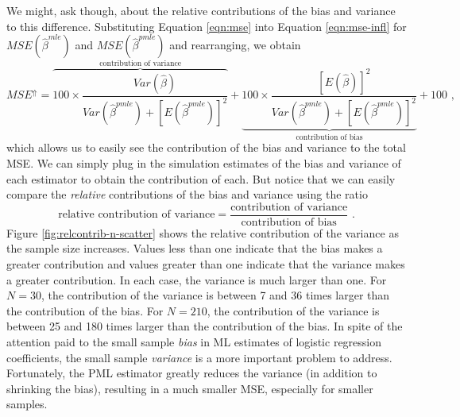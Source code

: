 \documentclass[12pt]{article}
\begin{document}
We might, ask though, about the relative contributions of the bias and variance to this difference. 
Substituting Equation \ref{eqn:mse} into Equation \ref{eqn:mse-infl} for $MSE(\hat{\beta}^{mle})$ and $MSE(\hat{\beta}^{pmle})$ and rearranging, we obtain
\begin{equation}
MSE^\Uparrow = \overbrace{100 \times \dfrac{Var(\hat{\beta})}{Var(\hat{\beta}^{pmle}) + [E(\hat{\beta}^{pmle})]^2}}^{\text{contribution of variance}} + \underbrace{100 \times \dfrac{[E(\hat{\beta})]^2}{Var(\hat{\beta}^{pmle}) + [E(\hat{\beta}^{pmle})]^2}}_{\text{contribution of bias}}  + 100 \text{ ,} \nonumber
\end{equation}
\noindent which allows us to easily see the contribution of the bias and variance to the total MSE.
We can simply plug in the simulation estimates of the bias and variance of each estimator to obtain the contribution of each.
But notice that we can easily compare the \textit{relative} contributions of the bias and variance using the ratio 
\begin{equation}\label{eqn:rel-contrib}
\text{relative contribution of variance} = \dfrac{\text{contribution of variance}}{\text{contribution of bias}} \text{ .} 
\end{equation}
\noindent Figure \ref{fig:relcontrib-n-scatter} shows the relative contribution of the variance as the sample size increases. 
Values less than one indicate that the bias makes a greater contribution and values greater than one indicate that the variance makes a greater contribution. 
In each case, the variance is much larger than one. 
For $N = 30$, the contribution of the variance is between 7 and 36 times larger than the contribution of the bias. 
For $N = 210$, the contribution of the variance is between 25 and 180 times larger than the contribution of the bias. 
In spite of the attention paid to the small sample \textit{bias} in ML estimates of logistic regression coefficients, the small sample \textit{variance} is a more important problem to address. 
Fortunately, the PML estimator greatly reduces the variance (in addition to shrinking the bias), resulting in a much smaller MSE, especially for smaller samples.
\end{document}
